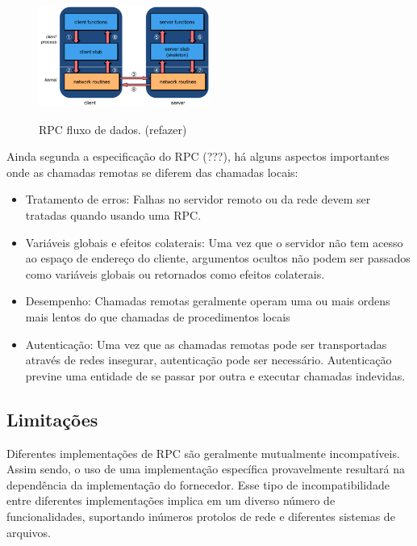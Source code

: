 \begin{figure}
\centering
\includegraphics[width=0.5\textwidth]{figuras/How-RPC-Works.png}
\label{fig:rpc}
\caption{RPC fluxo de dados. (refazer)}
\end{figure}

Ainda segunda a especificação do RPC \cite{rfc1831:rpc}(???), há alguns aspectos importantes onde as chamadas remotas se diferem das chamadas locais:

\begin{itemize}
\item Tratamento de erros: Falhas no servidor remoto ou da rede devem ser tratadas quando usando uma RPC.

\item Variáveis globais e efeitos colaterais: Uma vez que o servidor não tem acesso ao espaço de endereço do cliente, argumentos ocultos não podem ser passados como variáveis globais ou retornados como efeitos colaterais.

\item Desempenho: Chamadas remotas geralmente operam uma ou mais ordens mais lentos do que chamadas de procedimentos locais

\item Autenticação: Uma vez que as chamadas remotas pode ser transportadas através de redes insegurar, autenticação pode ser necessário. Autenticação previne uma entidade de se passar por outra e executar chamadas indevidas.

\end{itemize}

\subsection{Limitações}

Diferentes implementações de RPC são geralmente mutualmente incompatíveis. Assim sendo, o uso de uma implementação específica provavelmente resultará na dependência da implementação do fornecedor. Esse tipo de incompatibilidade entre diferentes implementações implica em um diverso número de funcionalidades, suportando inúmeros protolos de rede e diferentes sistemas de arquivos.

